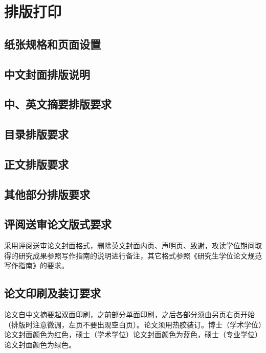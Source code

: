 
\chapter{排版打印}
\section{纸张规格和页面设置}
\section{中文封面排版说明}
\section{中、英文摘要排版要求}
\section{目录排版要求}
\section{正文排版要求}
\section{其他部分排版要求}
\section{评阅送审论文版式要求}
采用评阅送审论文封面格式，删除英文封面内页、声明页、致谢，攻读学位期间取得的研究成果参照写作指南的说明进行备注，其它格式参照《研究生学位论文规范写作指南》的要求。 
\section{论文印刷及装订要求}
论文自中文摘要起双面印刷，之前部分单面印刷，之后各部分须由另页右页开始（排版时注意微调，左页不要出现空白页）。论文须用热胶装订。博士（学术学位）论文封面颜色为红色，硕士（学术学位）论文封面颜色为蓝色，硕士（专业学位）论文封面颜色为绿色。